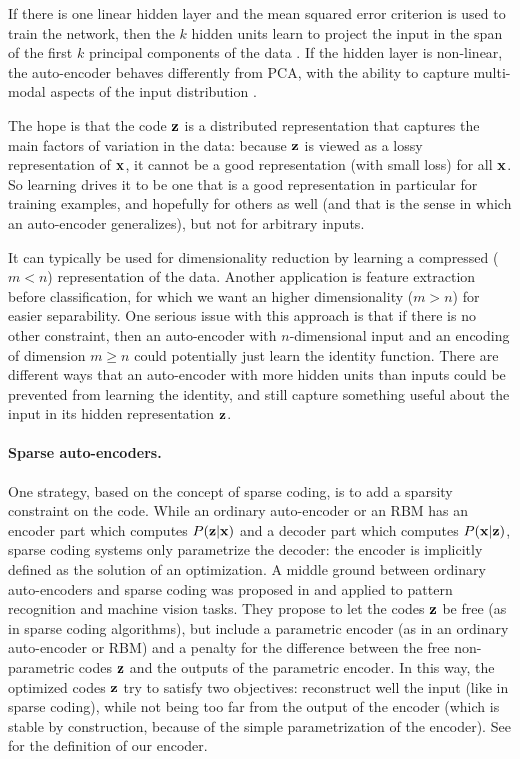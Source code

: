 
If there is one linear hidden layer and the mean squared error criterion is used to train the network, then the $k$ hidden units learn to project the input in the span of the first $k$ principal components of the data \cite{bourlard1988autoencoder}. If the hidden layer is non-linear, the auto-encoder behaves differently from \gls{PCA}, with the ability to capture multi-modal aspects of the input distribution \cite{japkowicz2000autoencoderPCA}.

The hope is that the code $\mathbf{z}$ is a distributed representation that captures the main factors of variation in the data: because $\mathbf{z}$ is viewed as a lossy representation of $\mathbf{x}$, it cannot be a good representation (with small loss) for all $\mathbf{x}$. So learning drives it to be one that is a good representation in particular for training examples, and hopefully for others as well (and that is the sense in which an auto-encoder generalizes), but not for arbitrary inputs.

It can typically be used for dimensionality reduction by learning a compressed ($m<n$) representation of the data. Another application is feature extraction before classification, for which we want an higher dimensionality ($m>n$) for easier separability. One serious issue with this approach is that if there is no other constraint, then an auto-encoder with $n$-dimensional input and an encoding of dimension $m \geq n$ could potentially just learn the identity function. There are different ways that an auto-encoder with more hidden units than inputs could be prevented from learning the identity, and still capture something useful about the input in its hidden representation $\mathbf{z}$.

\paragraph{Sparse auto-encoders.}
One strategy, based on the concept of sparse coding, is to add a sparsity constraint on the code. While an ordinary auto-encoder or an \gls{RBM} has an encoder part which computes $P(\mathbf{z}|\mathbf{x})$ and a decoder part which computes $P(\mathbf{x}|\mathbf{z})$, sparse coding systems only parametrize the decoder: the encoder is implicitly defined as the solution of an optimization. A middle ground between ordinary auto-encoders and sparse coding was proposed in \cite{lecun2006sparseAutoencoders, ranzato2007stackedSparseAutoencoders} and applied to pattern recognition and machine vision tasks. They propose to let the codes $\mathbf{z}$ be free (as in sparse coding algorithms), but include a parametric encoder (as in an ordinary auto-encoder or \gls{RBM}) and a penalty for the difference between the free non-parametric codes $\mathbf{z}$ and the outputs of the parametric encoder. In this way, the optimized codes $\mathbf{z}$ try to satisfy two objectives: reconstruct well the input (like in sparse coding), while not being too far from the output of the encoder (which is stable by construction, because of the simple parametrization of the encoder). See  for the definition of our encoder.

